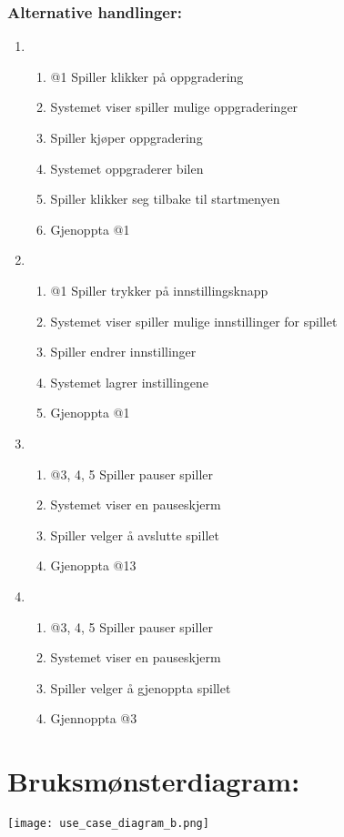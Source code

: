 \documentclass[12pt]{report}
\begin{document}
\subsubsection*{Alternative handlinger:}
\begin{enumerate}[label=\Alph*]
\item 
\bigskip
\begin{enumerate}
\item @1 Spiller klikker på oppgradering
\item Systemet viser spiller mulige oppgraderinger 
\item Spiller kjøper oppgradering
\item Systemet oppgraderer bilen
\item Spiller klikker seg tilbake til startmenyen
\item Gjenoppta @1
\end{enumerate}
\item 
\bigskip
\begin{enumerate}
\item @1 Spiller trykker på innstillingsknapp
\item Systemet viser spiller mulige innstillinger for spillet
\item Spiller endrer innstillinger
\item Systemet lagrer instillingene
\item Gjenoppta @1
\end{enumerate}
\item
\bigskip
\begin{enumerate}
\item @3, 4, 5 Spiller pauser spiller
\item Systemet viser en pauseskjerm
\item Spiller velger å avslutte spillet
\item Gjenoppta @13
\end{enumerate}
\item
\bigskip
\begin{enumerate}
\item @3, 4, 5 Spiller pauser spiller
\item Systemet viser en pauseskjerm
\item Spiller velger å gjenoppta spillet
\item Gjennoppta @3
\end{enumerate}
\end{enumerate}
\pagebreak
\section*{Bruksmønsterdiagram:}
\vspace{4cm}
\texttt{[image: use\_case\_diagram\_b.png]}
\end{document}
